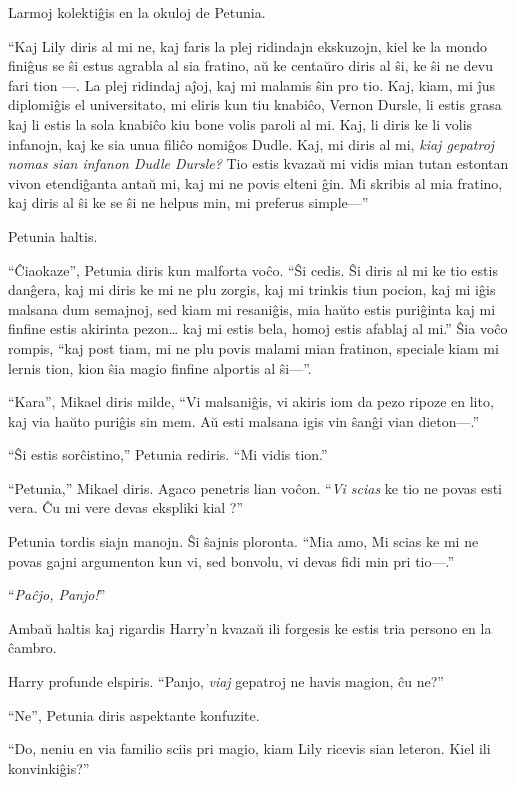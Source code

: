 Larmoj kolektiĝis en la okuloj de Petunia.

``Kaj Lily diris al mi ne, kaj faris la plej ridindajn ekskuzojn, kiel
ke la mondo finiĝus se ŝi estus agrabla al sia fratino, aŭ ke centaŭro
diris al ŝi, ke ŝi ne devu fari tion —. La plej ridindaj aĵoj, kaj mi
malamis ŝin pro tio. Kaj, kiam, mi ĵus diplomiĝis el universitato, mi
eliris kun tiu knabiĉo, Vernon Dursle, li estis grasa kaj li estis la
sola knabiĉo kiu bone volis paroli al mi. Kaj, li diris ke li volis
infanojn, kaj ke sia unua filiĉo nomiĝos Dudle. Kaj, mi diris al mi,
\emph{kiaj gepatroj nomas sian infanon Dudle Dursle?} Tio estis kvazaŭ
mi vidis mian tutan estontan vivon etendiĝanta antaŭ mi, kaj mi ne
povis elteni ĝin. Mi skribis al mia fratino, kaj diris al ŝi ke se ŝi
ne helpus min, mi preferus simple—''

Petunia haltis.

``Ĉiaokaze'', Petunia diris kun malforta voĉo. ``Ŝi cedis. Ŝi diris al
mi ke tio estis danĝera, kaj mi diris ke mi ne plu zorgis, kaj mi
trinkis tiun pocion, kaj mi iĝis malsana dum semajnoj, sed kiam mi
resaniĝis, mia haŭto estis puriĝinta kaj mi finfine estis akirinta
pezon\ldots{} kaj mi estis bela, homoj estis afablaj al mi.'' Ŝia voĉo
rompis, ``kaj post tiam, mi ne plu povis malami mian fratinon,
speciale kiam mi lernis tion, kion ŝia magio finfine alportis al
ŝi—''.

``Kara'', Mikael diris milde, ``Vi malsaniĝis, vi akiris iom da pezo
ripoze en lito, kaj via haŭto puriĝis sin mem. Aŭ esti
malsana igis vin ŝanĝi vian dieton—.''

``Ŝi estis sorĉistino,'' Petunia rediris. ``Mi vidis tion.''

``Petunia,'' Mikael diris. Agaco penetris lian voĉon. ``\emph{Vi scias} ke tio
ne povas esti vera. Ĉu mi vere devas ekspliki kial ?''

Petunia tordis siajn manojn. Ŝi ŝajnis ploronta. ``Mia amo, Mi
scias ke mi ne povas gajni argumenton kun vi, sed bonvolu, vi devas
fidi min pri tio—.''

``\emph{Paĉjo, Panjo!}''

Ambaŭ haltis kaj rigardis Harry'n kvazaŭ ili forgesis ke estis tria
persono en la ĉambro.

Harry profunde elspiris. ``Panjo, \emph{viaj} gepatroj ne havis
magion, ĉu ne?''

``Ne'', Petunia diris aspektante konfuzite.

``Do, neniu en via familio sciis pri magio, kiam Lily ricevis sian
leteron. Kiel ili konvinkiĝis?''

